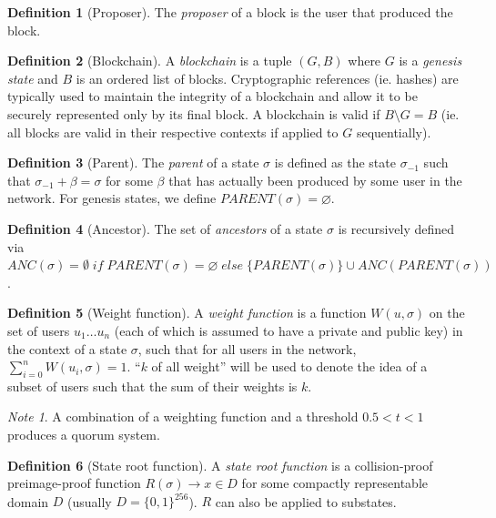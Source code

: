 \documentclass[11pt,a4paper]{report}
\theoremstyle{plain}
\theoremstyle{definition}
\newtheorem{defn}{Definition}[chapter]
\theoremstyle{remark}
\newtheorem*{note}{Note}
\begin{document}
\begin{defn}[Proposer]
The \emph{proposer} of a block is the user that produced the block.
\end{defn}

\begin{defn}[Blockchain]
A \emph{blockchain} is a tuple $(G, B)$ where $G$ is a \emph{genesis state} and $B$ is an ordered list of blocks. Cryptographic references (ie. hashes) are typically used to maintain the integrity of a blockchain and allow it to be securely represented only by its final block. A blockchain is valid if $B \setminus G = B$ (ie. all blocks are valid in their respective contexts if applied to $G$ sequentially). 
\end{defn}

\begin{defn}[Parent]
The \emph{parent} of a state $\sigma$ is defined as the state $\sigma_{-1}$ such that $\sigma_{-1} + \beta = \sigma$ for some $\beta$ that has actually been produced by some user in the network. For genesis states, we define $PARENT(\sigma) = \varnothing$.
\end{defn}

\begin{defn}[Ancestor]
The set of \emph{ancestors} of a state $\sigma$ is recursively defined via $ANC(\sigma) = \emptyset \; if \; PARENT(\sigma) = \varnothing \; else \; \{PARENT(\sigma)\} \cup ANC(PARENT(\sigma))$.
\end{defn}

\begin{defn}[Weight function]
A \emph{weight function} is a function $W(u, \sigma)$ on the set of users $u_1 \ldots u_n$ (each of which is assumed to have a private and public key) in the context of a state $\sigma$, such that for all users in the network, $\sum_{i=0}^n W(u_i, \sigma) = 1$. ``$k$ of all weight'' will be used to denote the idea of a subset of users such that the sum of their weights is $k$. 
\end{defn}

\begin{note}
A combination of a weighting function and a threshold $0.5 < t < 1$ produces a quorum system.
\end{note}

\begin{defn}[State root function]
A \emph{state root function} is a collision-proof preimage-proof function $R(\sigma) \rightarrow x \in D$ for some compactly representable domain $D$ (usually $D = \{0,1\}^{256}$). $R$ can also be applied to substates.
\end{defn}
\end{document}

